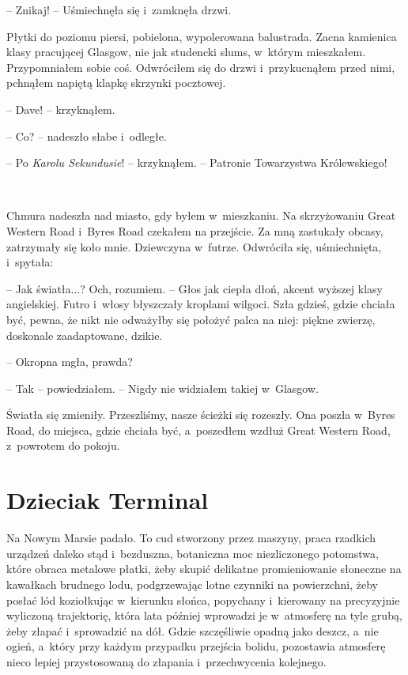 \documentclass[oneside,polish,11pt,sfheadings]{mwbk}
\begin{document}
-- Znikaj! -- Uśmiechnęła się i~zamknęła drzwi.

Płytki do poziomu piersi, pobielona, wypolerowana balustrada. Zacna
kamienica klasy pracującej Glasgow, nie jak studencki slums, w~którym
mieszkałem. Przypomniałem sobie coś. Odwróciłem się do drzwi i~przykucnąłem przed nimi, pchnąłem napiętą klapkę skrzynki pocztowej.

-- Dave! -- krzyknąłem.

-- Co? -- nadeszło słabe i~odległe.

-- Po \emph{Karolu Sekundusie}! -- krzyknąłem. -- Patronie Towarzystwa
Królewskiego!

~

Chmura nadeszła nad miasto, gdy byłem w~mieszkaniu. Na skrzyżowaniu
Great Western Road i~Byres Road czekałem na przejście. Za mną zastukały
obcasy, zatrzymały się koło mnie. Dziewczyna w~futrze. Odwróciła się,
uśmiechnięta, i~spytała: 

-- Jak światła...? Och, rozumiem. -- Głos jak
ciepła dłoń, akcent wyższej klasy angielskiej. Futro i~włosy błyszczały
kroplami wilgoci. Szła gdzieś, gdzie chciała być, pewna, że nikt nie
odważyłby się położyć palca na niej: piękne zwierzę, doskonale
zaadaptowane, dzikie.

-- Okropna mgła, prawda?

-- Tak -- powiedziałem. -- Nigdy nie widziałem takiej w~Glasgow.

Światła się zmieniły. Przeszliśmy, nasze ścieżki się rozeszły. Ona
poszła w~Byres Road, do miejsca, gdzie chciała być, a~poszedłem wzdłuż
Great Western Road, z~powrotem do pokoju.

\chapter{Dzieciak Terminal}

Na Nowym Marsie padało. To cud stworzony przez maszyny, praca rzadkich
urządzeń daleko stąd i~bezduszna, botaniczna moc niezliczonego
potomstwa, które obraca metalowe płatki, żeby skupić delikatne
promieniowanie słoneczne na kawałkach brudnego lodu, podgrzewając lotne
czynniki na powierzchni, żeby posłać lód koziołkując w~kierunku słońca,
popychany i~kierowany na precyzyjnie wyliczoną trajektorię, która lata
później wprowadzi je w~atmosferę na tyle grubą, żeby złapać i~sprowadzić
na dół. Gdzie szczęśliwie opadną jako deszcz, a~nie ogień, a~który przy
każdym przypadku przejścia bolidu, pozostawia atmosferę nieco lepiej
przystosowaną do złapania i~przechwycenia kolejnego.
\end{document}
